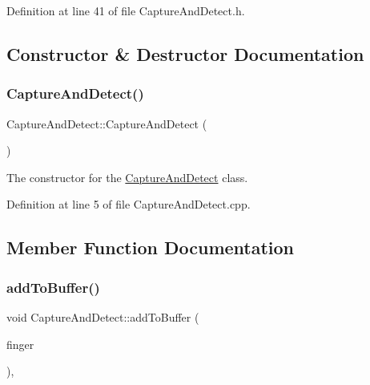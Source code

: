 Definition at line 41 of file Capture\+And\+Detect.\+h.



\subsection{Constructor \& Destructor Documentation}
\mbox{\label{class_gestro_1_1_capture_and_detect_a26c41eaa5100975ec0f50c97592f4bf1}} 
\subsubsection{\texorpdfstring{Capture\+And\+Detect()}{CaptureAndDetect()}}
{\footnotesize\ttfamily Capture\+And\+Detect\+::\+Capture\+And\+Detect (\begin{DoxyParamCaption}{ }\end{DoxyParamCaption})}

The constructor for the \hyperlink{class_gestro_1_1_capture_and_detect}{Capture\+And\+Detect} class. 

Definition at line 5 of file Capture\+And\+Detect.\+cpp.



\subsection{Member Function Documentation}
\mbox{\label{class_gestro_1_1_capture_and_detect_af376ab5418f7b235ee181d574da71fd6}} 
\subsubsection{\texorpdfstring{add\+To\+Buffer()}{addToBuffer()}}
{\footnotesize\ttfamily void Capture\+And\+Detect\+::add\+To\+Buffer (\begin{DoxyParamCaption}\item[{\hyperlink{class_gesture_detection_1_1_finger_and_coordinates}{Finger\+And\+Coordinates}}]{finger }\end{DoxyParamCaption})\hspace{0.3cm}{\ttfamily [override]}, {\ttfamily [virtual]}}

